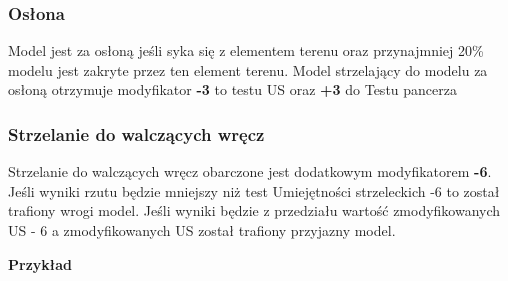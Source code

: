 \subsubsection{Osłona}
Model jest za osłoną jeśli syka się z elementem terenu oraz przynajmniej 20\% modelu jest zakryte przez ten element terenu. Model strzelający do modelu za osłoną otrzymuje modyfikator \textbf{-3} to testu US oraz \textbf{+3} do Testu pancerza

\subsubsection{Strzelanie do walczących wręcz}
Strzelanie do walczących wręcz obarczone jest dodatkowym modyfikatorem \textbf{-6}. Jeśli wyniki rzutu będzie mniejszy niż test Umiejętności strzeleckich -6 to został trafiony wrogi model. Jeśli wyniki będzie z przedziału wartość zmodyfikowanych US - 6 a zmodyfikowanych US został trafiony przyjazny model. 

\textbf{Przykład}
